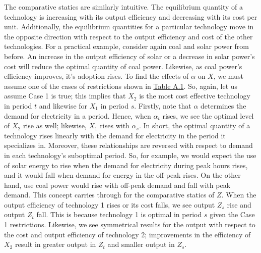 \documentclass[11pt,a4paper]{extarticle}
\begin{document}
The comparative statics are similarly intuitive. The equilibrium quantity of a technology is increasing with its output efficiency and decreasing with its cost per unit. Additionally, the equilibrium quantities for a particular technology move in the opposite direction with respect to the output efficiency and cost of the other technologies. For a practical example, consider again coal and solar power from before. An increase in the output efficiency of solar or a decrease in solar power's cost will reduce the optimal quantity of coal power. Likewise, as coal power's efficiency improves, it's adoption rises. To find the effects of $\alpha$ on $X$, we must assume one of the cases of restrictions shown in \hyperref[tab:paramrest]{Table A.1}. So, again, let us assume Case 1 is true; this implies that $X_2$ is the most cost effective technology in period $t$ and likewise for $X_1$ in period $s$. Firstly, note that $\alpha$ determines the demand for electricity in a period. Hence, when $\alpha_t$ rises, we see the optimal level of $X_2$ rise as well; likewise, $X_1$ rises with $\alpha_s$. In short, the optimal quantity of a technology rises linearly with the demand for electricity in the period it specializes in. Moreover, these relationships are reversed with respect to demand in each technology's suboptimal period. So, for example, we would expect the use of solar energy to rise when the demand for electricity during peak hours rises, and it would fall when demand for energy in the off-peak rises. On the other hand, use coal power would rise with off-peak demand and fall with peak demand. This concept carries through for the comparative statics of $Z$. When the output efficiency of technology 1 rises or its cost falls, we see output $Z_s$ rise and output $Z_t$ fall. This is because technology 1 is optimal in period $s$ given the Case 1 restrictions. Likewise, we see symmetrical results for the output with respect to the cost and output efficiency of technology 2; improvements in the efficiency of $X_2$ result in greater output in $Z_t$ and smaller output in $Z_s$.  
\end{document}
